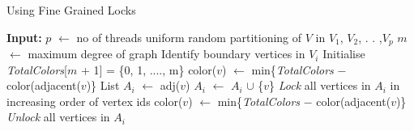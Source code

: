 \documentclass[a4paper,11pt]{article}
\begin{document}
\begin{algorithm}
\caption{Using Fine Grained Locks}
\label{alg3}

\begin{algorithmic}[1]
\State \textbf{Input:} $p$ $\leftarrow$ no of threads
\State uniform random partitioning of $V$ in $V_1$, $V_2$, . . ,$V_p$
\State $m$ $\leftarrow$ maximum degree of graph
\State Identify boundary vertices in $V_i$
\State Initialise \textit{TotalColors}[$m$ + 1] = \{0, 1, ...., m\}
\State color($v$) $\leftarrow$ min\{\textit{TotalColors} $-$ color(adjacent($v$)\}
\EndFor
{}
\State List $A_i$ $\leftarrow$ adj($v$)
\State $A_i$ $\leftarrow$ $A_i$ $\cup$ \{$v$\}
\State \textit{Lock} all vertices in $A_i$ in increasing order of vertex ids
\State color($v$) $\leftarrow$ min\{\textit{TotalColors} $-$ color(adjacent($v$)\}
\State \textit{Unlock} all vertices in $A_i$
\EndFor
\EndFor
\EndProcedure
\end{algorithmic}
\end{algorithm}
\vspace{-0.5cm}
\end{document}
